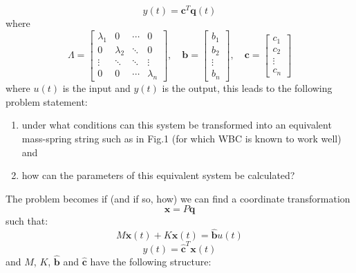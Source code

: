 \documentclass{mbd_fullpaper}
\begin{document}
\begin{equation}
y(t) = \mathbf{c}^T \mathbf{q}(t)
\label{eq:modal2}
\end{equation}
where
\begin{equation}
\Lambda = \begin{bmatrix}
\lambda_1  &  0 & \cdots & 0 \\
0 & \lambda_2  & \ddots & 0 \\
\vdots & \ddots & \ddots & \vdots \\
0 & 0 & \cdots & \lambda_n \end{bmatrix}
,\quad \mathbf{b} = \begin{bmatrix} b_1 \\ b_2 \\ \vdots \\ b_n \end{bmatrix}
,\quad \mathbf{c} = \begin{bmatrix} c_1 \\ c_2 \\ \vdots \\ c_n \end{bmatrix}
\label{eq:modal3}
\end{equation}
where $u(t)$ is the input and $y(t)$ is the output, this leads to the following problem statement:
\begin{enumerate}
\item under what conditions can this system be transformed into an equivalent mass-spring string such as in Fig.1 (for which WBC is known to work well) and
\item how can the parameters of this equivalent system be calculated?
\end{enumerate}
The problem becomes if (and if so, how) we can find a coordinate transformation
\begin{equation}
\mathbf{x} = P \mathbf{q}
\label{eq:transform}
\end{equation}
such that:
\begin{equation}
M\ddot{\mathbf{x}}(t) + K\mathbf{x}(t) = \mathbf{\hat{b}}u(t)
\label{eq:ms1}
\end{equation}
\begin{equation}
y(t) = \mathbf{\hat{c}}^T \mathbf{x}(t)
\label{eq:ms2}
\end{equation}
and $M$, $K$, $\mathbf{\hat{b}}$ and $\mathbf{\hat{c}}$ have the following structure:
\end{document}
